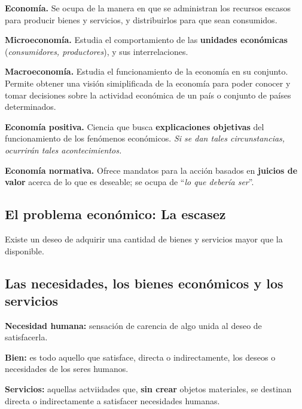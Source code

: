 \documentclass[10pt,a4paper]{article}
\begin{document}
\begin{description}
\item \textbf{Economía.} Se ocupa de la manera en que se administran los recursos escasos para producir bienes y servicios, y distribuirlos para que sean consumidos.
\\
\item \textbf{Microeconomía.} Estudia el comportamiento de las \textbf{unidades económicas} (\textit{consumidores, productores}), y sus interrelaciones.
\item \textbf{Macroeconomía.} Estudia el funcionamiento de la economía en su conjunto. Permite obtener una visión simiplificada de la economía para poder conocer y tomar decisiones sobre la actividad económica de un país o conjunto de países determinados.
\\
\item \textbf{Economía positiva.} Ciencia que busca \textbf{explicaciones objetivas} del funcionamiento de los fenómenos económicos. \textit{Si se dan tales circunstancias, ocurrirán tales acontecimientos.} 
\item \textbf{Economía normativa.} Ofrece mandatos para la acción basados en \textbf{juicios de valor} acerca de lo que es deseable; se ocupa de ``\textit{lo que debería ser}''.
\end{description}

\subsection{El problema económico: La escasez}

Existe un deseo de adquirir una cantidad de bienes y servicios mayor que la disponible.

\subsection{Las necesidades, los bienes económicos y los servicios}

\begin{description}
\item \textbf{Necesidad humana:} sensación de carencia de algo unida al deseo de satisfacerla.
\item \textbf{Bien:} es todo aquello que satisface, directa o indirectamente, los deseos o necesidades de los seres humanos.
\item \textbf{Servicios:} aquellas actviidades que, \textbf{sin crear} objetos materiales, se destinan directa o indirectamente a satisfacer necesidades humanas.
\end{description}
\end{document}

